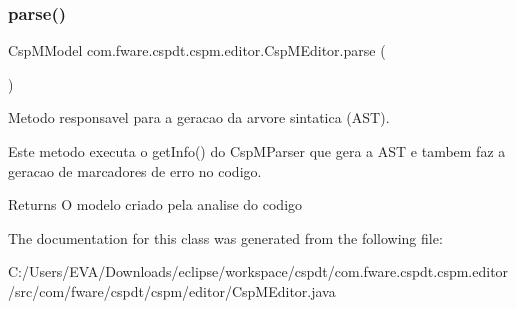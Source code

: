 \subsubsection{\texorpdfstring{parse()}{parse()}}
{\footnotesize\ttfamily Csp\+M\+Model com.\+fware.\+cspdt.\+cspm.\+editor.\+Csp\+M\+Editor.\+parse (\begin{DoxyParamCaption}{ }\end{DoxyParamCaption})\hspace{0.3cm}{\ttfamily [inline]}}



Metodo responsavel para a geracao da arvore sintatica (A\+ST). 

Este metodo executa o get\+Info() do Csp\+M\+Parser que gera a A\+ST e tambem faz a geracao de marcadores de erro no codigo.

\begin{DoxyReturn}{Returns}
O modelo criado pela analise do codigo 
\end{DoxyReturn}


The documentation for this class was generated from the following file\+:\begin{DoxyCompactItemize}
\item 
C\+:/\+Users/\+E\+V\+A/\+Downloads/eclipse/workspace/cspdt/com.\+fware.\+cspdt.\+cspm.\+editor/src/com/fware/cspdt/cspm/editor/Csp\+M\+Editor.\+java\end{DoxyCompactItemize}
